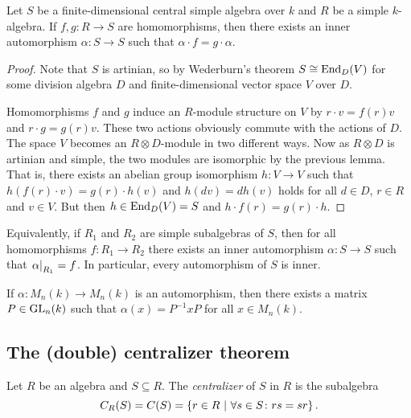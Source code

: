\begin{izrek}
Let $S$ be a finite-dimensional central simple algebra over $k$ and
$R$ be a simple $k$-algebra. If $f, g \colon R \to S$ are
homomorphisms, then there exists an inner automorphism
$\alpha \colon S \to S$ such that
$\alpha \cdot f = g \cdot \alpha$.
\end{izrek}

\begin{proof}
Note that $S$ is artinian, so by Wederburn's theorem
$S \cong \operatorname{End}_D(V)$ for some division algebra $D$ and
finite-dimensional vector space $V$ over $D$.

Homomorphisms $f$ and $g$ induce an $R$-module structure on $V$ by
$r \cdot v = f(r) v$ and $r \cdot g = g(r) v$. These two actions
obviously commute with the actions of $D$. The space $V$ becomes an
$R \otimes D$-module in two different ways. Now as $R \otimes D$ is
artinian and simple, the two modules are isomorphic by the previous
lemma. That is, there exists an abelian group isomorphism
$h \colon V \to V$ such that $h(f(r) \cdot v) = g(r) \cdot h(v)$
and $h(dv) = d h(v)$ holds for all $d \in D$, $r \in R$ and
$v \in V$. But then $h \in \operatorname{End}_D(V) = S$ and
$h \cdot f(r) = g(r) \cdot h$.
\end{proof}

\begin{opomba}
Equivalently, if $R_1$ and $R_2$ are simple subalgebras of $S$,
then for all homomorphisms $f \colon R_1 \to R_2$ there exists an
inner automorphism $\alpha \colon S \to S$ such that
$\left. \alpha\right|_{R_1}^{} = f$. In particular, every automorphism of
$S$ is inner.
\end{opomba}

\begin{posledica}
If $\alpha \colon M_n(k) \to M_n(k)$ is an automorphism, then there
exists a matrix $P \in \operatorname{GL}_n(k)$ such that $\alpha(x) = P^{-1} x P$
for all $x \in M_n(k)$.
\end{posledica}

\newpage

\subsection{The (double) centralizer theorem}

\begin{definicija}
Let $R$ be an algebra and $S \subseteq R$. The
\emph{centralizer} of $S$ in $R$ is the
subalgebra
\[
C_R(S) = C(S) = \left\{r \in R~\middle\vert~\forall s \in S \colon rs = sr\right\}.
\]
\end{definicija}


